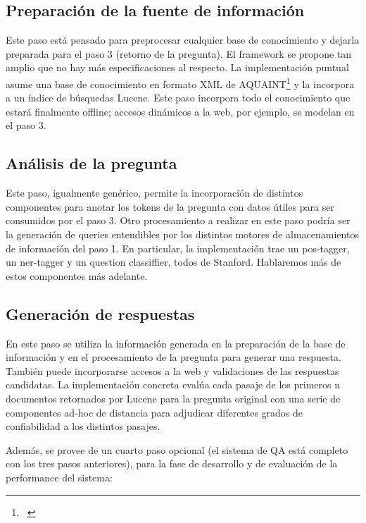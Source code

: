 \bigskip

\subsection{Preparación de la fuente de información}
Este paso está pensado para preprocesar cualquier base de conocimiento
y dejarla preparada para el paso 3 (retorno de la pregunta). El
framework se propone tan amplio que no hay más especificaciones al
respecto. La implementación puntual asume una base de conocimiento en
formato XML de AQUAINT\footnote{\ } y la incorpora a un índice de
búsquedas Lucene. Este paso incorpora todo el conocimiento que
estará finalmente offline; accesos dinámicos a la web, por ejemplo,
se modelan en el paso 3.


\bigskip

\subsection{Análisis de la pregunta}
Este paso, igualmente genérico, permite la incorporación de
distintos componentes para anotar los tokens de la pregunta con datos
útiles para ser consumidos por el paso 3. Otro procesamiento a
realizar en este paso podría ser la generación de queries
entendibles por los distintos motores de almacenamientos de
información del paso 1. En particular, la implementación trae un
pos-tagger, un ner-tagger y un question classiffier, todos de Stanford.
Hablaremos más de estos componentes más adelante. 


\bigskip

\subsection{Generación de respuestas}
En este paso se utiliza la información generada en la preparación
de la base de información y en el procesamiento de la pregunta para
generar una respuesta. También puede incorporarse accesos a la web y
validaciones de las respuestas candidatas. La implementación concreta
evalúa cada pasaje de los primeros n documentos retornados por Lucene
para la pregunta original con una serie de componentes ad-hoc de
distancia para adjudicar diferentes grados de confiabilidad a los
distintos pasajes. \newline


Además, se provee de un cuarto paso opcional (el sistema de QA está
completo con los tres pasos anteriores), para la fase de desarrollo y
de evaluación de la performance del sistema:\newline


